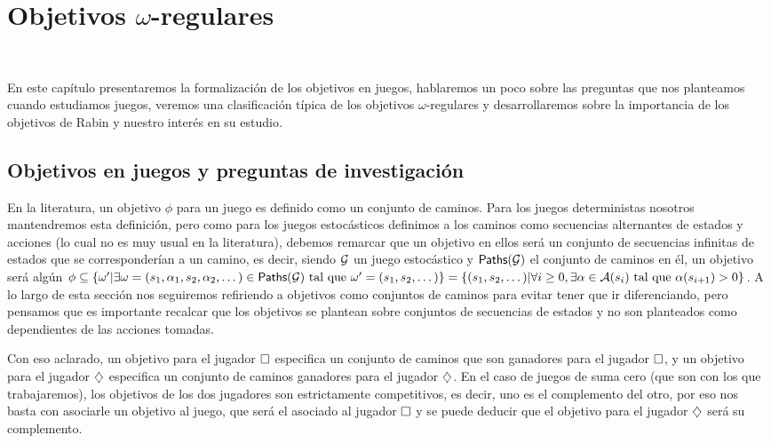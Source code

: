 \chapter{Objetivos $\omega$-regulares}
~\label{cap:objetivos}


En este capítulo presentaremos la formalización de los objetivos en juegos,
hablaremos un poco sobre las preguntas que nos planteamos cuando estudiamos
juegos, veremos una clasificación típica de los objetivos $\omega$-regulares y
desarrollaremos sobre la importancia de los objetivos de Rabin y nuestro
interés en su estudio.

\section{Objetivos en juegos y preguntas de investigación}

En la literatura, un objetivo $\phi$ para un juego es definido como un conjunto
de caminos. Para los juegos deterministas nosotros mantendremos esta
definición, pero como para los juegos estocásticos definimos a los caminos como
secuencias alternantes de estados y acciones (lo cual no es muy usual en la
literatura), debemos remarcar que un objetivo en ellos será un conjunto de
secuencias infinitas de estados que se corresponderían a un camino, es decir,
siendo $\mathcal{G}$ un juego estocástico y $\textsf{Paths}(\mathcal{G})$ el conjunto de caminos en él,
un objetivo será algún $\phi \subseteq \{\omega' | \exists \omega = (s_1,
	\alpha_1, s_2, \alpha_2, \dots) \in \textsf{Paths}(\mathcal{G}) \text{ tal que } \omega' = (s_1,
	s_2, \dots)\} = \{(s_1, s_2, \dots) | \forall i \geq 0, \exists \alpha \in
	\mathcal{A}(s_i) \text{ tal que } \alpha(s_{i+1}) > 0\}$. A lo largo de esta sección
nos seguiremos refiriendo a objetivos como conjuntos de caminos para evitar
tener que ir diferenciando, pero pensamos que es importante recalcar que los
objetivos se plantean sobre conjuntos de secuencias de estados y no son
planteados como dependientes de las acciones tomadas.

Con eso aclarado, un objetivo para el jugador $\square$ especifica un conjunto de
caminos que son ganadores para el jugador $\square$, y un objetivo para el
jugador $\diamondsuit$ especifica un conjunto de caminos ganadores para el jugador
$\diamondsuit$. En el caso de juegos de suma cero (que son con los que trabajaremos),
los objetivos de los dos jugadores son estrictamente competitivos, es decir,
uno es el complemento del otro, por eso nos basta con asociarle un objetivo al
juego, que será el asociado al jugador $\square$ y se puede deducir que el
objetivo para el jugador $\diamondsuit$ será su complemento.

